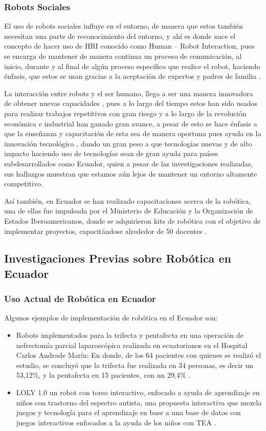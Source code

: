 \documentclass[conference]{IEEEtran}
\begin{document}
\subsubsection{Robots Sociales}
El uso de robots sociales influye en el entorno, de manera que estos también necesitan una parte de reconocimiento del entorno, y ahí es donde nace el concepto de hacer uso de HRI conocido como Human – Robot Interaction, pues se encarga de mantener de manera continua un proceso de comunicación, al inicio, durante y al final de algún proceso especifico que realice el robot, haciendo énfasis, que estos se usan gracias a la aceptación de expertos y padres de familia \cite{Tekerek2009}.


La interacción entre robots y el ser humano, llega a ser una manera innovadora de obtener nuevas capacidades \cite{Johal2020}, pues a lo largo del tiempo estos han sido usados para realizar trabajos repetitivos con gran riesgo y a lo largo de la revolución económica e industrial han ganado gran avance, a pesar de esto se hace énfasis a que la enseñanza y capacitación de esta sea de manera oportuna pues ayuda en la innovación tecnológica \cite{Broadbent2017}, dando un gran peso a que tecnologías nuevas y de alto impacto haciendo uso de tecnologías sean de gran ayuda para países subdesarrollados como Ecuador, quien a pesar de las investigaciones realizadas, sus hallazgos muestran que estamos aún lejos de mantener un entorno altamente competitivo.

Así también, en Ecuador se han realizado capacitaciones acerca de la robótica, una de ellas fue impulsada por el Ministerio de Educación y la Organización de Estados Iberoamericanos, donde se adquirieron kits de robótica con el objetivo de implementar proyectos, capacitándose alrededor de 50 docentes \cite{OEI2023}.

\subsection{Investigaciones Previas sobre Robótica en Ecuador}
\subsubsection{Uso Actual de Robótica en Ecuador}
Algunos ejemplos de implementación de robótica en el Ecuador son:
\begin{itemize}
\item Robots implementados para la trifecta y pentafecta en una operación de nefrectomía parcial laparoscópica realizada en ecuatorianos en el Hospital Carlos Andrade Marín: En donde, de los 64 pacientes con quienes se realizó el estudio, se concluyó que la trifecta fue realizada en 34 personas, es decir un 53,12\%, y la pentafecta en 15 pacientes, con un 29,4\% \cite{Salgado2024}.

\item LOLY 1.0 un robot con torso interactivo, enfocado a ayuda de aprendizaje en niños con trastorno del espectro autista, una propuesta interactiva que mezcla juegos y tecnología para el aprendizaje en base a una base de datos con juegos interactivos enfocados a la ayuda de los niños con TEA \cite{Paillacho2021}.
\end{itemize}
\end{document}
